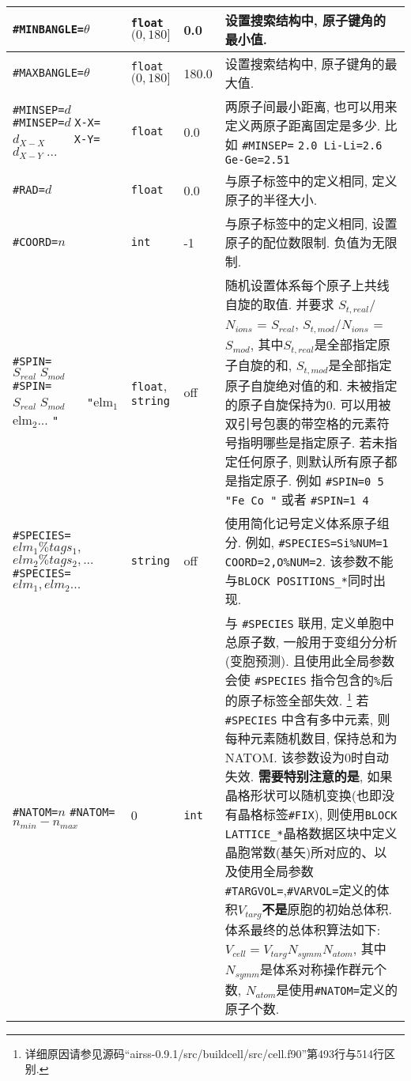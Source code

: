 \documentclass[a4paper, 10pt]{article}
\begin{document}
\begin{center}
\begin{longtable}{m{11em}|m{4em}<{\centering}|m{3em}<{\centering}|m{15em}}
\midrule
\verb|#MINBANGLE=|\(\theta\) & \verb|float| \((0,180]\) & 0.0 & 设置搜索结构中, 原子键角的最小值.\\
\midrule
\verb|#MAXBANGLE=|\(\theta\) & \verb|float| \((0,180]\) & 180.0 &设置搜索结构中, 原子键角的最大值.\\
\midrule
\verb|#MINSEP=|\(d\) \verb|#MINSEP=|\(d\;\)\verb|X-X=|\(d_{X−X}\;\)\ \ \  \ \verb|X-Y=|\(d_{X−Y}\;...\) & \verb|float| & 0.0 & 两原子间最小距离, 也可以用来定义两原子距离固定是多少. 比如 \verb|#MINSEP=| \verb|2.0 Li-Li=2.6 Ge-Ge=2.51|\\
\midrule
\verb|#RAD=|\(d\)& \verb|float|  & 0.0 & 与原子标签中的定义相同, 定义原子的半径大小.\\
\midrule
\verb|#COORD=|\(n\)& \verb|int| & -1 & 与原子标签中的定义相同, 设置原子的配位数限制. 负值为无限制.\\
\midrule
\verb|#SPIN=|\(S_{real}\;S_{mod}\;\;\;\;\;\;\) \verb|#SPIN=|\(S_{real}\;S_{mod}\;\;\;\;\;\) \verb|"|elm\(_1\) elm\(_2\)... \verb|"| & \verb|float|,  \verb|string|& off & 随机设置体系每个原子上共线自旋的取值. 并要求 \(S_{t,real}\)/\(N_{ions}\) = \(S_{real}\), \(S_{t,mod}\)/\(N_{ions}\) = \(S_{mod}\), 其中\(S_{t,real}\)是全部指定原子自旋的和, \(S_{t,mod}\)是全部指定原子自旋绝对值的和. 未被指定的原子自旋保持为0. 可以用被双引号包裹的带空格的元素符号指明哪些是指定原子. 若未指定任何原子, 则默认所有原子都是指定原子. 例如 \verb|#SPIN=0 5 "Fe Co "| 或者 \verb|#SPIN=1 4| \\
\midrule
\verb|#SPECIES=|\(elm_1\%tags_1,\) \(elm_2\%tags_2,...\;\;\;\;\;\;\) \verb|#SPECIES=|\(elm_1,elm_2...\) & \verb|string|  & off & 使用简化记号定义体系原子组分. 例如, \verb|#SPECIES=Si|\verb|%NUM=1| \verb|COORD=2,|\verb|O%NUM=2|. 该参数不能与\verb|BLOCK POSITIONS_*|同时出现.\\
\midrule
\verb|#NATOM=|\(n\) \hspace{6em}\verb|#NATOM=|\(n_{min}-n_{max}\)  & 0 & \verb|int| & 与 \verb|#SPECIES| 联用, 定义单胞中总原子数, 一般用于变组分分析(变胞预测). 且使用此全局参数会使 \verb|#SPECIES| 指令包含的\verb|%|后的原子标签全部失效. \footnote{详细原因请参见源码``airss-0.9.1/src/buildcell/src/cell.f90''第493行与514行区别.} 若 \verb|#SPECIES| 中含有多中元素, 则每种元素随机数目, 保持总和为NATOM. 该参数设为0时自动失效. \textbf{需要特别注意的是}, 如果晶格形状可以随机变换(也即没有晶格标签\verb|#FIX|), 则使用\verb|BLOCK LATTICE_*|晶格数据区块中定义晶胞常数(基矢)所对应的、以及使用全局参数\verb|#TARGVOL=|,\verb|#VARVOL=|定义的体积\(V_{targ}\)\textbf{不是}原胞的初始总体积. 体系最终的总体积算法如下: \(V_{cell} = V_{targ} N_{symm} N_{atom} \), 其中\(N_{symm}\)是体系对称操作群元个数, \(N_{atom}\)是使用\verb|#NATOM=|定义的原子个数.\\

\end{longtable}
\end{center}
\end{document}
